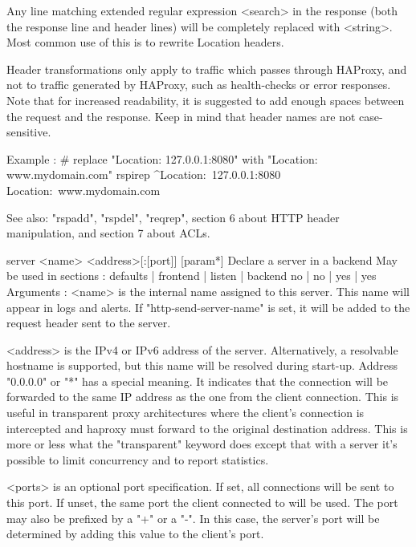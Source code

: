   Any line matching extended regular expression <search> in the response (both
  the response line and header lines) will be completely replaced with
  <string>. Most common use of this is to rewrite Location headers.

  Header transformations only apply to traffic which passes through HAProxy,
  and not to traffic generated by HAProxy, such as health-checks or error
  responses. Note that for increased readability, it is suggested to add enough
  spaces between the request and the response. Keep in mind that header names
  are not case-sensitive.

  Example :
     # replace "Location: 127.0.0.1:8080" with "Location: www.mydomain.com"
     rspirep ^Location:\ 127.0.0.1:8080    Location:\ www.mydomain.com

  See also: "rspadd", "rspdel", "reqrep", section 6 about HTTP header
            manipulation, and section 7 about ACLs.


server <name> <address>[:[port]] [param*]
  Declare a server in a backend
  May be used in sections :   defaults | frontend | listen | backend
                                 no    |    no    |   yes  |   yes
  Arguments :
    <name>    is the internal name assigned to this server. This name will
              appear in logs and alerts.  If "http-send-server-name" is
              set, it will be added to the request header sent to the server.

    <address> is the IPv4 or IPv6 address of the server. Alternatively, a
              resolvable hostname is supported, but this name will be resolved
              during start-up. Address "0.0.0.0" or "*" has a special meaning.
              It indicates that the connection will be forwarded to the same IP
              address as the one from the client connection. This is useful in
              transparent proxy architectures where the client's connection is
              intercepted and haproxy must forward to the original destination
              address. This is more or less what the "transparent" keyword does
              except that with a server it's possible to limit concurrency and
              to report statistics.

    <ports>   is an optional port specification. If set, all connections will
              be sent to this port. If unset, the same port the client
              connected to will be used. The port may also be prefixed by a "+"
              or a "-". In this case, the server's port will be determined by
              adding this value to the client's port.

